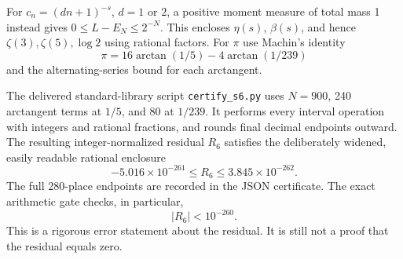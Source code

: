 For \(c_n=(dn+1)^{-s}\), \(d=1\) or \(2\), a positive
moment measure of total mass 1 instead gives
\(0\leq L-E_N\leq2^{-N}\).
This encloses \(\eta(s)\), \(\beta(s)\), and hence
\(\zeta(3),\zeta(5),\log2\) using rational factors.
For \(\pi\) use Machin's identity
\[
 \pi=16\arctan(1/5)-4\arctan(1/239)
\]
and the alternating-series bound for each arctangent.

The delivered standard-library script \texttt{certify\_s6.py} uses
\(N=900\), 240 arctangent terms at \(1/5\), and 80 at \(1/239\).
It performs every interval operation with integers and rational
fractions, and rounds final decimal endpoints outward.
The resulting integer-normalized residual \(R_6\) satisfies the
deliberately widened, easily readable rational enclosure
\begin{equation}\label{eq:S6-certificate}
 -5.016\times10^{-261}\leq R_6\leq3.845\times10^{-262}.
\end{equation}
The full 280-place endpoints are recorded in the JSON certificate.
The exact arithmetic gate checks, in particular,
\[
 \boxed{|R_6|<10^{-260}.}
\]
This is a rigorous error statement about the residual.
It is still not a proof that the residual equals zero.

